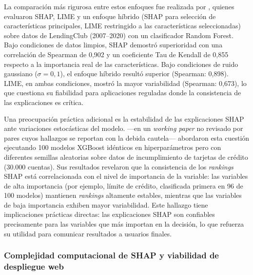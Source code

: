 \documentclass[12pt, letterpaper]{article}
\begin{document}
La comparaci\'on m\'as rigurosa entre estos enfoques fue realizada por \citet{Pathi2025}, quienes evaluaron SHAP, LIME y un enfoque h\'ibrido (SHAP para selecci\'on de caracter\'isticas principales, LIME restringido a las caracter\'isticas seleccionadas) sobre datos de LendingClub (2007--2020) con un clasificador Random Forest. Bajo condiciones de datos limpios, SHAP demostr\'o superioridad con una correlaci\'on de Spearman de 0,902 y un coeficiente Tau de Kendall de 0,855 respecto a la importancia real de las caracter\'isticas. Bajo condiciones de ruido gaussiano ($\sigma = 0,1$), el enfoque h\'ibrido result\'o superior (Spearman: 0,898). LIME, en ambas condiciones, mostr\'o la mayor variabilidad (Spearman: 0,673), lo que cuestiona su fiabilidad para aplicaciones reguladas donde la consistencia de las explicaciones es cr\'itica.

Una preocupaci\'on pr\'actica adicional es la estabilidad de las explicaciones SHAP ante variaciones estoc\'asticas del modelo. \citet{Lin2024} ---en un \textit{working paper} no revisado por pares cuyos hallazgos se reportan con la debida cautela--- abordaron esta cuesti\'on ejecutando 100 modelos XGBoost id\'enticos en hiperpar\'ametros pero con diferentes semillas aleatorias sobre datos de incumplimiento de tarjetas de cr\'edito (30.000 cuentas). Sus resultados revelaron que la consistencia de los \textit{rankings} SHAP est\'a correlacionada con el nivel de importancia de la variable: las variables de alta importancia (por ejemplo, l\'imite de cr\'edito, clasificada primera en 96 de 100 modelos) mantienen \textit{rankings} altamente estables, mientras que las variables de baja importancia exhiben mayor variabilidad. Este hallazgo tiene implicaciones pr\'acticas directas: las explicaciones SHAP son confiables precisamente para las variables que m\'as importan en la decisi\'on, lo que refuerza su utilidad para comunicar resultados a usuarios finales.

\subsubsection{Complejidad computacional de SHAP y viabilidad de despliegue web}
\label{sec:xai-complejidad}
\end{document}
